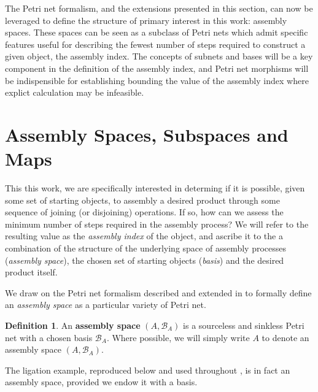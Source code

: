 \documentclass[aps,prd,onecolumn,nofootinbib,letterpaper,preprintnumbers,superscriptaddress,eqsecnum]{revtex4}
\theoremstyle{definition}
\newtheorem{definition}{Definition}
\newcommand{\B}{\mathcal{B}}
\begin{document}
The Petri net formalism, and the extensions presented in this section, can now be leveraged to define the structure of primary interest in this work: assembly spaces.
These spaces can be seen as a subclass of Petri nets which admit specific features useful for describing the fewest number of steps required to construct a given object, the assembly index.
The concepts of subnets and bases will be a key component in the definition of the assembly index, and Petri net morphisms will be indispensible for establishing bounding the value of the assembly index where explict calculation may be infeasible.

\section{Assembly Spaces, Subspaces and Maps}\label{sec:assembly-spaces}

This this work, we are specifically interested in determing if it is possible, given some set of starting objects, to assembly a desired product through some sequence of joining (or disjoining) operations.
If so, how can we assess the minimum number of steps required in the assembly process?
We will refer to the resulting value as the \textit{assembly index} of the object, and ascribe it to the a combination of the structure of the underlying space of assembly processes (\textit{assembly space}), the chosen set of starting objects (\textit{basis}) and the desired product itself.

We draw on the Petri net formalism described and extended in  to formally define an \textit{assembly space} as a particular variety of Petri net.

\begin{definition}\label{def:assembly-space}
    An \textbf{assembly space} $(A, \B_A)$ is a sourceless and sinkless Petri net with a chosen basis $\B_A$.
    Where possible, we will simply write $A$ to denote an assembly space $(A, \B_A)$.
\end{definition}

The ligation example, reproduced below and used throughout , is in fact an assembly space, provided we endow it with a basis.
\end{document}

